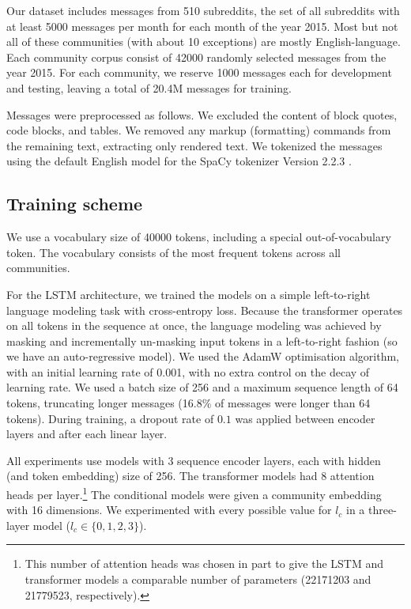\documentclass[11pt]{article}
\begin{document}
Our dataset includes messages from \num{510} subreddits, 
the set of all subreddits 
with at least \num{5000} messages per month for each month
of the year 2015.
Most but not all of these communities (with about 10 exceptions) 
are mostly English-language.
Each community corpus consist of \num{42000} randomly selected messages from the year 2015.
For each community, we reserve \num{1000} messages each for development and testing,
leaving a total of \num{20.4}M messages for training.

Messages were preprocessed as follows. 
We excluded the content of block quotes, code blocks, and tables.
We removed any markup (formatting) commands from the remaining text, 
extracting only rendered text.
We tokenized the messages using the default English model for the SpaCy tokenizer 
Version 2.2.3 \citep{Honnibal2017}.


\subsection{Training scheme}

We use a vocabulary size of \num{40000} tokens, including a special
out-of-vocabulary token.  The vocabulary consists of the most frequent
tokens across all communities.

For the LSTM architecture, we trained the models on a simple left-to-right language
modeling task with cross-entropy loss.  Because
the transformer operates on all tokens in the sequence at once, the
language modeling was achieved by masking and incrementally un-masking
input tokens in a left-to-right fashion (so we have an
auto-regressive model).  We used the AdamW
\citep{Loshchilov2019} optimisation algorithm, with an initial
learning rate of \num{0.001}, with no extra control on the decay
of learning rate.
%
We used a batch size of \num{256} and a maximum sequence length of
\num{64} tokens, truncating longer messages (16.8\% of messages were
longer than \num{64} tokens).  During training, a dropout rate of
$0.1$ was applied between encoder layers and after each linear layer.

All experiments use models with \num{3} sequence encoder layers,
each with hidden (and token embedding) size of \num{256}. 
The transformer models had \num{8} attention heads per layer.\footnote{
  This number of attention heads was chosen in part to give the LSTM and transformer
  models a comparable number of parameters 
  (\num{22171203} and \num{21779523}, respectively).}
The conditional models were given a community embedding with \num{16} dimensions. 
We experimented with every possible value for $l_c$ in a three-layer model ($l_c\in\{0,1,2,3\}$).
\end{document}
